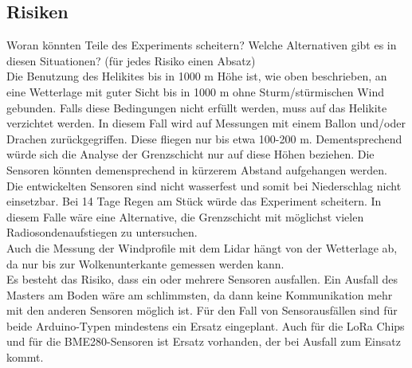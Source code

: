 \documentclass[a4paper,11pt,DIV=calc,tablecaptionabove,headinclude,twoside]{article}
\begin{document}
\subsection{Risiken}
\label{Risiken}
Woran könnten Teile des Experiments scheitern? Welche Alternativen gibt es in diesen Situationen? (für jedes Risiko einen Absatz)\\

Die Benutzung des Helikites bis in 1000 m Höhe ist, wie oben beschrieben, an eine
Wetterlage mit guter Sicht bis in 1000 m ohne Sturm/stürmischen Wind gebunden. Falls diese Bedingungen nicht erfüllt werden, muss
auf das Helikite verzichtet werden. In diesem Fall wird auf Messungen mit einem Ballon und/oder Drachen 
zurückgegriffen. Diese fliegen nur bis etwa 100-200 m. Dementsprechend würde sich die Analyse der Grenzschicht 
nur auf diese Höhen beziehen. Die Sensoren könnten demensprechend in kürzerem Abstand aufgehangen werden.\\
Die entwickelten Sensoren sind nicht wasserfest und somit bei Niederschlag nicht einsetzbar. Bei 14 Tage Regen am Stück
würde das Experiment scheitern. In diesem Falle wäre eine Alternative, die Grenzschicht mit möglichst vielen Radiosondenaufstiegen
zu untersuchen. \\
Auch die Messung der Windprofile mit dem Lidar hängt von der Wetterlage ab, da nur bis zur Wolkenunterkante gemessen werden kann. \\
Es besteht das Risiko, dass ein oder mehrere Sensoren ausfallen. Ein Ausfall des Masters am Boden wäre am
schlimmsten, da dann keine Kommunikation mehr mit den anderen Sensoren möglich ist. Für den Fall von 
Sensorausfällen sind für beide Arduino-Typen mindestens ein Ersatz eingeplant. Auch für die LoRa Chips und für
die BME280-Sensoren ist Ersatz vorhanden, der bei Ausfall zum Einsatz kommt.\\
\end{document}
